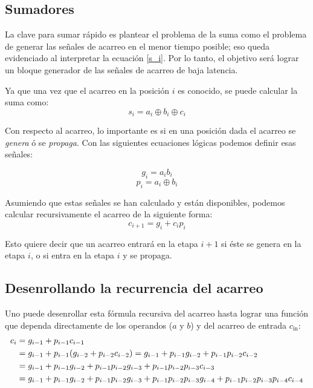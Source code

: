 
\subsection{Sumadores }

La clave para sumar rápido es plantear el problema de la suma como el problema de generar las señales de acarreo en el menor tiempo posible; eso queda evidenciado al interpretar la ecuación \ref{s_i}. Por lo tanto, el objetivo será lograr un bloque generador de las señales de acarreo de baja latencia\cite{arithmeticComputer}.

Ya que una vez que el acarreo en la posición \(i\) es conocido, se puede calcular la suma como:
\begin{equation}\label{s_i}
s_i = a_i \oplus b_i\oplus c_i
\end{equation}

Con respecto al acarreo, lo importante es si en una posición dada el acarreo se \emph{genera} ó se \emph{propaga}. Con las siguientes ecuaciones lógicas podemos definir esas señales:
%

$$g_i=a_ib_i$$
$$p_i=a_i \oplus b_i$$


Asumiendo que estas señales se han calculado y están disponibles, podemos calcular recursivamente el acarreo de la siguiente forma:
\begin{equation}
c_{i+1}=g_i + c_i p_i
\end{equation}


\noindent Esto quiere decir que un acarreo entrará en la etapa \(i+1\) si éste se genera en la etapa \(i\), o si entra en la etapa \(i\) y se propaga.

\subsection{Desenrollando la recurrencia del acarreo}
Uno puede desenrollar esta fórmula recursiva del acarreo hasta lograr una función que dependa directamente de los operandos ($a$ y $b$) y del acarreo de entrada $c_{\text{in}}$:
\begin{equation}
\begin{align}
c_i &= g_{i-1} + p_{i-1}c_{i-1}\notag\\
&=g_{i-1}+p_{i-1}(g_{i-2}+p_{i-2}c_{i-2})=g_{i-1}+p_{i-1}g_{i-2}+p_{i-1}p_{i-2}c_{i-2}\notag\\
&=g_{i-1} + p_{i-1}g_{i-2}+p_{i-1}p_{i-2}g_{i-3}+p_{i-1}p_{i-2}p_{i-3}c_{i-3}\notag\\
&=g_{i-1} +p_{i-1}g_{i-2}+p_{i-1}p_{i-2}g_{i-3}+p_{i-1}p_{i-2}p_{i-3}g_{i-4}+p_{i-1}p_{i-2}p_{i-3}p_{i-4}c_{i-4}\label{gyp}	
\end{align}
\end{equation}

